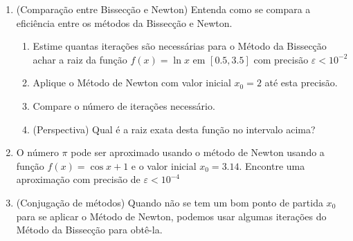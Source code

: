 \documentclass[a4paper]{article}
\begin{document}
\begin{enumerate}
\item (Comparação entre Bissecção e Newton) Entenda como se compara a
  eficiência entre os métodos da Bissecção e Newton.

  \begin{enumerate}
  \item Estime quantas iterações são necessárias para o Método da
    Bissecção achar a raiz da função $f(x)=\ln x$ em $[0.5, 3.5]$ com
    precisão $\varepsilon < 10^{-2}$
  \item Aplique o Método de Newton com valor inicial $x_0 = 2$ até esta
    precisão.
  \item Compare o número de iterações necessário.
  \item (Perspectiva) Qual é a raiz exata desta função no intervalo
    acima?
  \end{enumerate}
 

\item O número $\pi$ pode ser aproximado usando o método de Newton
  usando a função $f(x) = \cos x +1$ e o valor inicial $x_0 =
  3.14$. Encontre uma aproximação com precisão de $\varepsilon <
  10^{-4}$

\item (Conjugação de métodos) Quando não se tem um bom ponto de
  partida $x_0$ para se aplicar o Método de Newton, podemos usar
  algumas iterações do Método da Bissecção para obtê-la.

\end{enumerate}
\end{document}
